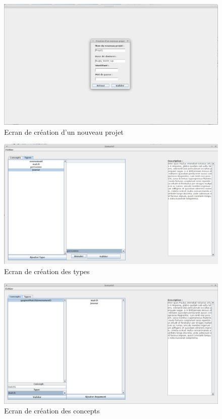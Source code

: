 \documentclass[12pt]{report}
\begin{document}
\begin{figure}
\centering
\includegraphics[scale=0.3]{IHM/creation_projet.png}
\caption{Ecran de création d'un nouveau projet}
\end{figure}
\begin{figure}
\centering
\includegraphics[scale=0.3]{IHM/creation_types.png}
\caption{Ecran de création des types}
\end{figure}
\begin{figure}
\centering
\includegraphics[scale=0.3]{IHM/creation_concepts.png}
\caption{Ecran de création des concepts}
\end{figure}
\end{document}

